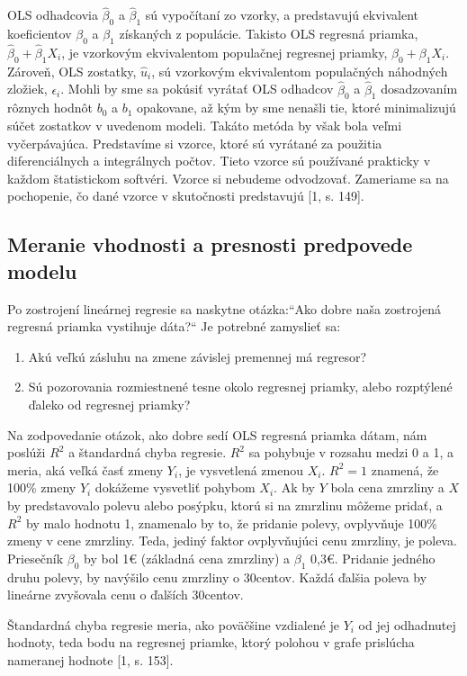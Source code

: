 \documentclass[]{tukediphc}
\begin{document}
OLS odhadcovia $\hat\beta_0$ a $\hat\beta_1$ sú vypočítaní zo vzorky, a predstavujú ekvivalent koeficientov $\beta_0$ a $\beta_1$ získaných z populácie. Takisto OLS regresná priamka, $\hat\beta_0 + \hat\beta_{1}X_i$, je vzorkovým ekvivalentom populačnej regresnej priamky, $\beta_0 + \beta_{1}X_i$. Zároveň, OLS zostatky, $\hat{u}_i$, sú vzorkovým ekvivalentom populačných náhodných zložiek, $\epsilon_i$. Mohli by sme sa pokúsiť vyrátať OLS odhadcov $\hat\beta_0$ a $\hat\beta_1$ dosadzovaním rôznych hodnôt $b_0$ a $b_1$ opakovane, až kým by sme nenašli tie, ktoré minimalizujú súčet zostatkov v uvedenom modeli. Takáto metóda by však bola veľmi vyčerpávajúca. Predstavíme si vzorce, ktoré sú vyrátané za použitia diferenciálnych a integrálnych počtov. Tieto vzorce sú používané prakticky v každom štatistickom softvéri. Vzorce si nebudeme odvodzovať. Zameriame sa na pochopenie, čo dané vzorce v skutočnosti predstavujú [1, s. 149]. 

\subsection{Meranie vhodnosti a presnosti predpovede modelu}

Po zostrojení lineárnej regresie sa naskytne otázka:“Ako dobre naša zostrojená regresná priamka vystihuje dáta?“ Je potrebné zamyslieť sa: 
\begin{enumerate}
\item Akú veľkú zásluhu na zmene závislej premennej má regresor?  
\item Sú pozorovania rozmiestnené tesne okolo regresnej priamky, alebo rozptýlené ďaleko od regresnej priamky?
\end{enumerate}
Na zodpovedanie otázok, ako dobre sedí OLS regresná priamka dátam, nám poslúži $R^2$ a štandardná chyba regresie. $R^2$ sa pohybuje v rozsahu medzi 0 a 1, a meria, aká veľká časť zmeny $Y_i$, je vysvetlená zmenou $X_i$. $R^2 = 1$ znamená, že 100\% zmeny $Y_i$ dokážeme vysvetliť pohybom $X_i$. Ak by $Y$ bola cena zmrzliny a $X$ by predstavovalo polevu alebo posýpku, ktorú si na zmrzlinu môžeme pridať, a $R^2$ by malo hodnotu 1, znamenalo by to, že pridanie polevy, ovplyvňuje 100\% zmeny v cene zmrzliny. Teda, jediný faktor ovplyvňujúci cenu zmrzliny, je poleva. Priesečník $\beta_0$ by bol 1€ (základná cena zmrzliny) a $\beta_1$ 0,3€. Pridanie jedného druhu polevy, by navýšilo cenu zmrzliny o 30centov. Každá ďalšia poleva by lineárne zvyšovala cenu o ďalších 30centov. 

Štandardná chyba regresie meria, ako poväčšine vzdialené je $Y_i$ od jej odhadnutej hodnoty, teda bodu na regresnej priamke, ktorý polohou v grafe prislúcha nameranej hodnote [1, s. 153].  
\end{document}
